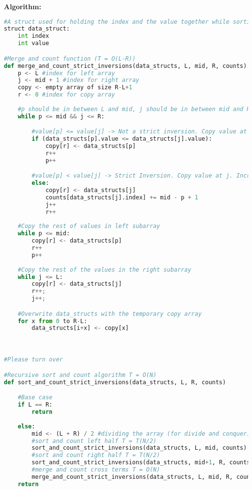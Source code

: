 \documentclass[10pt, a4paper]{article}
\begin{document}
\textbf{Algorithm:}
\begin{lstlisting}[language=Python,caption= Count smaller to right]
#A struct used for holding the index and the value together while sorting
struct data_struct:
    int index
    int value

#Merge and count function (T = O(L-R))
def merge_and_count_strict_inversions(data_structs, L, mid, R, counts):
    p <- L #index for left array
    j <- mid + 1 #index for right array
    copy <- empty array of size R-L+1
    r <- 0 #index for copy array
    
    #p should be in between L and mid, j should be in between mid and R.
    while p <= mid && j <= R:

        #value[p] <= value[j] -> Not a strict inversion. Copy value at p.
        if (data_structs[p].value <= data_structs[j].value): 
            copy[r] <- data_structs[p]
            r++
            p++

        #value[p] < value[j] -> Strict Inversion. Copy value at j. Increment count j by number of smaller elements (mid-p+1)
        else:
            copy[r] <- data_structs[j]
            counts[data_structs[j].index] += mid - p + 1
            j++
            r++
    
    #Copy the rest of values in left subarray
    while p <= mid: 
        copy[r] <- data_structs[p]
        r++
        p++
    
    #Copy the rest of the values in the right subarray
    while j <= L: 
        copy[r] <- data_structs[j]
        r++;
        j++;

    #Overwrite data_structs with the temporary copy array
    for x from 0 to R-L:
        data_structs[i+x] <- copy[x]



#Please turn over

#Recursive sort and count algorithm T = O(N)
def sort_and_count_strict_inversions(data_structs, L, R, counts)

    #Base case
    if L == R:
        return
    
    else:
        mid <- (L + R) / 2 #dividing the array (for divide and conquer)
        #sort and count left half T = T(N/2)
        sort_and_count_strict_inversions(data_structs, L, mid, counts)
        #sort and count right half T = T(N/2)
        sort_and_count_strict_inversions(data_structs, mid+1, R, counts)
        #merge and count cross terms T = O(N)
        merge_and_count_strict_inversions(data_structs, L, mid, R, counts)
    return


\end{lstlisting}
\end{document}
